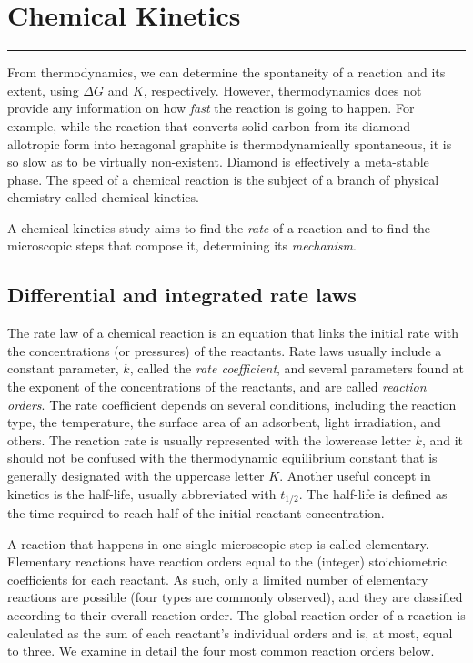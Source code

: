 \documentclass[
  9pt,
]{extbook}
\theoremstyle{definition}
\theoremstyle{definition}
\theoremstyle{definition}
\theoremstyle{remark}
\begin{document}
\hypertarget{Kinetics}{%
\chapter{Chemical Kinetics}\label{Kinetics}}

\begin{center}\rule{0.5\linewidth}{0.5pt}\end{center}

From thermodynamics, we can determine the spontaneity of a reaction and its extent, using \(\Delta G\) and \(K\), respectively. However, thermodynamics does not provide any information on how \emph{fast} the reaction is going to happen. For example, while the reaction that converts solid carbon from its diamond allotropic form into hexagonal graphite is thermodynamically spontaneous, it is so slow as to be virtually non-existent. Diamond is effectively a meta-stable phase. The speed of a chemical reaction is the subject of a branch of physical chemistry called chemical kinetics.

A chemical kinetics study aims to find the \emph{rate} of a reaction and to find the microscopic steps that compose it, determining its \emph{mechanism}.

\hypertarget{diffintk}{%
\section{Differential and integrated rate laws}\label{diffintk}}

The rate law of a chemical reaction is an equation that links the initial rate with the concentrations (or pressures) of the reactants. Rate laws usually include a constant parameter, \(k\), called the \emph{rate coefficient}, and several parameters found at the exponent of the concentrations of the reactants, and are called \emph{reaction orders}. The rate coefficient depends on several conditions, including the reaction type, the temperature, the surface area of an adsorbent, light irradiation, and others. The reaction rate is usually represented with the lowercase letter \(k\), and it should not be confused with the thermodynamic equilibrium constant that is generally designated with the uppercase letter \(K\). Another useful concept in kinetics is the half-life, usually abbreviated with \(t_{1/2}\). The half-life is defined as the time required to reach half of the initial reactant concentration.

A reaction that happens in one single microscopic step is called elementary. Elementary reactions have reaction orders equal to the (integer) stoichiometric coefficients for each reactant. As such, only a limited number of elementary reactions are possible (four types are commonly observed), and they are classified according to their overall reaction order. The global reaction order of a reaction is calculated as the sum of each reactant's individual orders and is, at most, equal to three. We examine in detail the four most common reaction orders below.
\end{document}
